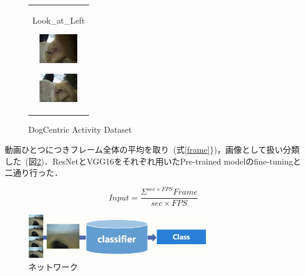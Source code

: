 \documentclass[twocolumn, a4paper]{UECIEresume}
\begin{document}
\begin{figure}[htbp]
\begin{tabular}{c}
\begin{minipage}{0.18\hsize}
\begin{center}
       \hspace{0.1cm} {Look\_at\_Left} 
      \end{center}
     \end{minipage}
     \begin{minipage}{0.18\hsize}
      \begin{center}
       \includegraphics[clip, width=1.7cm]{./Img/KL004.eps}
       \hspace{1.3cm} { } 
      \end{center}
     \end{minipage}
     \begin{minipage}{0.18\hsize}
      \begin{center}
       \includegraphics[clip, width=1.7cm]{./Img/KL005.eps}
       \hspace{1.6cm} { }
      \end{center}
     \end{minipage}

    \end{tabular}
    \caption{DogCentric Activity Dataset}
    \label{dcad_img}
\end{figure}

動画ひとつにつきフレーム全体の平均を取り~(式\ref{frame}\})，画像として扱い分類した~(図\ref{net})．ResNetとVGG16をそれぞれ用いたPre-trained modelのfine-tuningと二通り行った．

\begin{equation}
 \label{frame}
 Input = \frac{\Sigma^{sec \times FPS} Frame}{sec \times FPS}
\end{equation}

\begin{figure}[htbp]
 \begin{center}
  \includegraphics[width=8cm]{./Img/net.eps}
  \caption{ネットワーク}
  \label{net}
 \end{center}
\end{figure}
\end{document}
